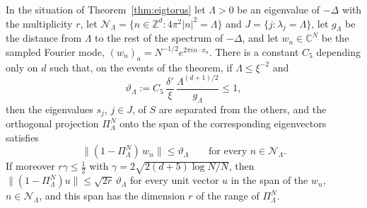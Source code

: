 \begin{corollary}\label{cor:eigspace}
In the situation of Theorem~\ref{thm:eigtorus} let $\Lambda>0$ be an eigenvalue of $-\Delta$ with the multiplicity $r$, let $\mathcal N_\Lambda=\{n\in\mathbb Z^d:4\pi^2|n|^2=\Lambda\}$ and $J=\{j:\lambda_j=\Lambda\}$, let $g_\Lambda$ be the distance from $\Lambda$ to the rest of the spectrum of $-\Delta$, and let $w_n\in\mathbb C^N$ be the sampled Fourier mode, $(w_n)_a=N^{-1/2}e^{2\pi in\cdot x_a}$. There is a constant $C_5$ depending only on $d$ such that, on the events of the theorem, if $\Lambda\le\xi^{-2}$ and
\[
\vartheta_\Lambda:=C_5\,\frac{\delta'}{\xi}\,\frac{\Lambda^{(d+1)/2}}{g_\Lambda}\le1,
\]
then the eigenvalues $s_j$, $j\in J$, of $S$ are separated from the others, and the orthogonal projection $\Pi^N_\Lambda$ onto the span of the corresponding eigenvectors satisfies
\[
\big\|(1-\Pi^N_\Lambda)\,w_n\big\|\le\vartheta_\Lambda\qquad\text{for every }n\in\mathcal N_\Lambda .
\]
If moreover $r\gamma\le\frac12$ with $\gamma=2\sqrt{2(d+5)\log N/N}$, then $\|(1-\Pi^N_\Lambda)u\|\le\sqrt{2r}\,\vartheta_\Lambda$ for every unit vector $u$ in the span of the $w_n$, $n\in\mathcal N_\Lambda$, and this span has the dimension $r$ of the range of $\Pi^N_\Lambda$.
\end{corollary}

